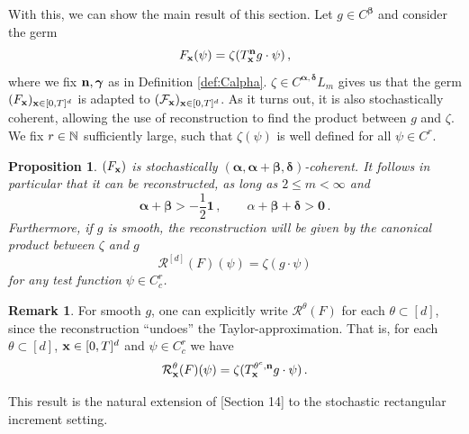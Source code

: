 \documentclass[12pt]{article}
\numberwithin{equation}{section}
\theoremstyle{plain}
\newtheorem{proposition}[theorem]{Proposition}
\theoremstyle{definition}
\newtheorem{remark}[theorem]{Remark}
\def\cR{\mathcal{R}}\def\cE{\mathcal{E}}
\def\falpha{{\boldsymbol\alpha}}
\def\fbeta{{\boldsymbol\beta}}
\def\fgamma{{\boldsymbol\gamma}}
\def\fdelta{{\boldsymbol\delta}}
\def\foo{{\boldsymbol 0}}
\def\fone{{\boldsymbol 1}}
\begin{document}
\noindent With this, we can show the main result of this section. Let $g\in C^\fbeta$ and consider the germ
\[
F_\mathbf x(\psi) = \zeta(T_\mathbf x^\mathbf n g\cdot\psi)\,,
\]
where we fix $\fn,\fgamma$ as in Definition \ref{def:Calpha}. $\zeta\in C^{\falpha,\fdelta}L_m$ gives us that the germ $(F_\mathbf x)_{\mathbf x\in[0,T]^d}$ is adapted to $(\mathcal{F}_\mathbf x)_{\mathbf x\in[0,T]^d}$. As it turns out, it is also stochastically coherent, allowing the use of reconstruction to find the product between $g$ and $\zeta$. We fix $r\in\mathbb{N}$ sufficiently large, such that $\zeta(\psi)$ is well defined for all $\psi\in C^r$.

\begin{proposition}\label{prop:YoungProduct}
    $(F_\mathbf x)$ is stochastically $(\falpha, \falpha+\fbeta,\fdelta)$-coherent. It follows in particular that it can be reconstructed, as long as $2\le m<\infty$ and
    \begin{equation}\label{cond:TaylorRecon}
        \falpha+\fbeta > -\frac 12\fone\,,\qquad \alpha+\fbeta+\fdelta>\foo\,. 
    \end{equation}
    Furthermore, if $g$ is smooth, the reconstruction will be given by the canonical product between $\zeta$ and $g$
    \[
        \cR^{[d]}(F)(\psi) = \zeta(g\cdot\psi)
    \]
    for any test function $\psi\in C_c^{r}$.
\end{proposition}

\begin{remark}
    For smooth $g$, one can explicitly write $\cR^\theta(F)$ for each $\theta\subset[d]$, since the reconstruction ``undoes'' the Taylor-approximation. That is, for each $\theta\subset[d]$, $\mathbf x\in[0,T]^d$ and $\psi\in C_c^{r}$ we have
    \begin{equation}\label{eq:ReconstructionTaylor}
        \cR^\theta_\fx(F)(\psi) = \zeta(T^{\theta^c,\fn}_\fx g\cdot\psi)\,.
    \end{equation}
\end{remark}


\noindent This result is the natural extension of \cite{zambotti2020}[Section 14] to the stochastic rectangular increment setting.
\end{document}
